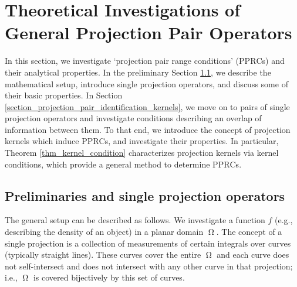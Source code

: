 \documentclass[12pt]{article}
\newcommand{\conditionname}{$\mathrm{PPRC}$}
\DeclareMathOperator{\imgdom}{{\Omega}}
\begin{document}
\section{Theoretical Investigations of General Projection Pair Operators}
\label{section_Abstract}

In this section, we investigate `projection pair range conditions' (\conditionname s) and their analytical properties. In the preliminary Section \ref{section_projection_pair_preliminaries}, we describe the mathematical setup, introduce single projection operators, and discuss some of their basic properties. In Section \ref{section_projection_pair_identification_kernels}, we move on to pairs of single projection operators and investigate conditions describing an overlap of information between them. To that end, we introduce the concept of projection kernels which induce \conditionname s, and investigate their properties. In particular, Theorem \ref{thm_kernel_condition} characterizes projection kernels via kernel conditions, which provide a general method to determine \conditionname s. 



\subsection{Preliminaries and single projection operators}
\label{section_projection_pair_preliminaries}
The general setup can be described as follows. We investigate a function $f$ (e.g., describing the density of an object) in a planar domain $\imgdom$. The concept of a single projection is a collection of measurements of certain integrals over curves (typically straight lines). These curves cover the entire $\imgdom$ and each curve does not self-intersect and does not intersect with any other curve in that projection; i.e., $\imgdom$ is covered bijectively by this set of curves. 
\end{document}
